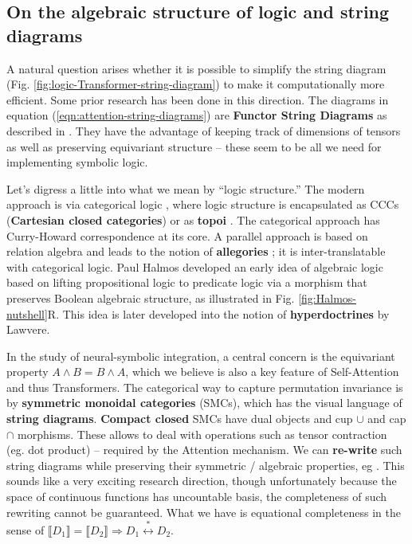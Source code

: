 \documentclass[runningheads]{llncs}
\begin{document}
\subsection{On the algebraic structure of logic and string diagrams}

A natural question arises whether it is possible to simplify the string diagram (Fig. \ref{fig:logic-Transformer-string-diagram}) to make it computationally more efficient.  Some prior research has been done in this direction. The diagrams in equation (\ref{eqn:attention-string-diagrams}) are \textbf{Functor String Diagrams} as described in \cite{Abbott2024}. They have the advantage of keeping track of dimensions of tensors as well as preserving equivariant structure -- these seem to be all we need for implementing symbolic logic.

Let's digress a little into what we mean by ``logic structure.''  The modern approach is via categorical logic \cite{Jacobs1999} \cite{Lambek1986}, where logic structure is encapsulated as CCCs (\textbf{Cartesian closed categories}) or as \textbf{topoi} \cite{Goldblatt1984}.  The categorical approach has Curry-Howard correspondence \cite{Sorensen2006} at its core.  A parallel approach is based on relation algebra and leads to the notion of \textbf{allegories} \cite{Freyd1990}; it is inter-translatable with categorical logic.  Paul Halmos developed an early idea of algebraic logic based on lifting propositional logic to predicate logic via a morphism that preserves Boolean algebraic structure, as illustrated in Fig. \ref{fig:Halmos-nutshell}R. This idea is later developed into the notion of \textbf{hyperdoctrines} by Lawvere.

In the study of neural-symbolic integration, a central concern is the equivariant property $A \wedge B = B \wedge A$, which we believe is also a key feature of Self-Attention \cite{Vaswani2017} and thus Transformers.  The categorical way to capture permutation invariance is by \textbf{symmetric monoidal categories} (SMCs), which has the visual language of \textbf{string diagrams}.  \textbf{Compact closed} SMCs have dual objects and cup $\cup$ and cap $\cap$ morphisms. These allows to deal with operations such as tensor contraction (eg. dot product) -- required by the Attention mechanism.  We can \textbf{re-write} such string diagrams while preserving their symmetric / algebraic properties, eg \cite{Bonchi2022}. This sounds like a very exciting research direction, though unfortunately because the space of continuous functions has uncountable basis, the completeness of such rewriting cannot be guaranteed. What we have is equational completeness in the sense of $ \llbracket D_1 \rrbracket = \llbracket D_2 \rrbracket \Rightarrow D_1 \stackrel{*}{\leftrightarrow} D_2 $.
\end{document}
